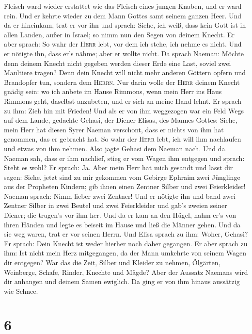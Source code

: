 Fleisch ward wieder erstattet wie das Fleisch eines jungen Knaben, und
er ward rein.  Und er kehrte wieder zu dem Mann Gottes
samt seinem ganzen Heer. Und da er hineinkam, trat er vor ihn und
sprach: Siehe, ich weiß, dass kein Gott ist in allen Landen, außer in
Israel; so nimm nun den Segen von deinem Knecht.  Er aber
sprach: So wahr der \textsc{Herr} lebt, vor dem ich stehe, ich nehme es
nicht. Und er nötigte ihn, dass er's nähme; aber er wollte nicht.
 Da sprach Naeman: Möchte denn deinem Knecht nicht
gegeben werden dieser Erde eine Last, soviel zwei Maultiere tragen? Denn
dein Knecht will nicht mehr anderen Göttern opfern und Brandopfer tun,
sondern dem \textsc{Herrn}.  Nur darin wolle der
\textsc{Herr} deinem Knecht gnädig sein: wo ich anbete im Hause Rimmons,
wenn mein Herr ins Haus Rimmons geht, daselbst anzubeten, und er sich an
meine Hand lehnt.  Er sprach zu ihm: Zieh hin mit
Frieden! Und als er von ihm weggezogen war ein Feld Wegs auf dem Lande,
 gedachte Gehasi, der Diener Elisas, des Mannes Gottes:
Siehe, mein Herr hat diesen Syrer Naeman verschont, dass er nichts von
ihm hat genommen, das er gebracht hat. So wahr der \textsc{Herr} lebt,
ich will ihm nachlaufen und etwas von ihm nehmen.  Also
jagte Gehasi dem Naeman nach. Und da Naeman sah, dass er ihm nachlief,
stieg er vom Wagen ihm entgegen und sprach: Steht es wohl?
 Er sprach: Ja. Aber mein Herr hat mich gesandt und lässt
dir sagen: Siehe, jetzt sind zu mir gekommen vom Gebirge Ephraim zwei
Jünglinge aus der Propheten Kindern; gib ihnen einen Zentner Silber und
zwei Feierkleider!  Naeman sprach: Nimm lieber zwei
Zentner! Und er nötigte ihn und band zwei Zentner Silber in zwei Beutel
und zwei Feierkleider und gab's zweien seiner Diener; die trugen's vor
ihm her.  Und da er kam an den Hügel, nahm er's von ihren
Händen und legte es beiseit im Hause und ließ die Männer gehen.
 Und da sie weg waren, trat er vor seinen Herrn. Und
Elisa sprach zu ihm: Woher, Gehasi? Er sprach: Dein Knecht ist weder
hierher noch daher gegangen.  Er aber sprach zu ihm: Ist
nicht mein Herz mitgegangen, da der Mann umkehrte von seinem Wagen dir
entgegen? War das die Zeit, Silber und Kleider zu nehmen, Ölgärten,
Weinberge, Schafe, Rinder, Knechte und Mägde?  Aber der
Aussatz Naemans wird dir anhangen und deinem Samen ewiglich. Da ging er
von ihm hinaus aussätzig wie Schnee.

\hypertarget{section-5}{%
\section{6}\label{section-5}}

